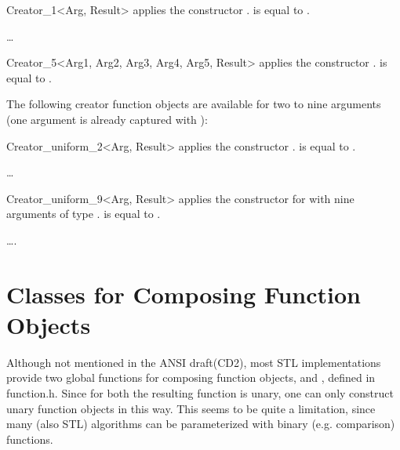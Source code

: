 
\ccHtmlNoClassFile
\begin{ccClassTemplate}{Creator_1<Arg, Result>}
    {applies the constructor .
       is equal to .}
\end{ccClassTemplate}

\ldots

\ccHtmlNoClassFile
\begin{ccClassTemplate}{Creator_5<Arg1, Arg2, Arg3, Arg4, Arg5, Result>}
    {applies the constructor .
       is equal to .}
\end{ccClassTemplate}

The following creator function objects are available for two to nine
arguments (one argument is already captured with ):

\ccHtmlNoClassFile
\begin{ccClassTemplate}{Creator_uniform_2<Arg, Result>}
    {applies the constructor .
       is equal to .}
\end{ccClassTemplate}

\ldots

\ccHtmlNoClassFile
\begin{ccClassTemplate}{Creator_uniform_9<Arg, Result>}
    {applies the constructor for  with nine arguments of
     type .   is equal to .}
\end{ccClassTemplate}

\ccSeeAlso

 \ldots.


\newpage
\section{Classes for Composing Function Objects}
\label{sectionComposeFunctionClasses}

Although not mentioned in the ANSI draft(CD2), most STL
implementations provide two global functions for composing function
objects,  and , defined in
function.h. Since for both the resulting function is unary, one can
only construct unary function objects in this way. This seems to be
quite a limitation, since many (also STL) algorithms can be
parameterized with binary (e.g. comparison) functions.

